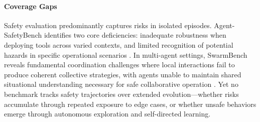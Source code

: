 \documentclass[10pt]{article} %
\begin{document}
\paragraph{Coverage Gaps}
Safety evaluation predominantly captures risks in isolated episodes. Agent-SafetyBench identifies two core deficiencies: inadequate robustness when deploying tools across varied contexts, and limited recognition of potential hazards in specific operational scenarios \citep{zhang2024agentsafety}. In multi-agent settings, SwarmBench reveals fundamental coordination challenges where local interactions fail to produce coherent collective strategies, with agents unable to maintain shared situational understanding necessary for safe collaborative operation \citep{ruan2025benchmarking}. Yet no benchmark tracks safety trajectories over extended evolution—whether risks accumulate through repeated exposure to edge cases, or whether unsafe behaviors emerge through autonomous exploration and self-directed learning.
\end{document}
